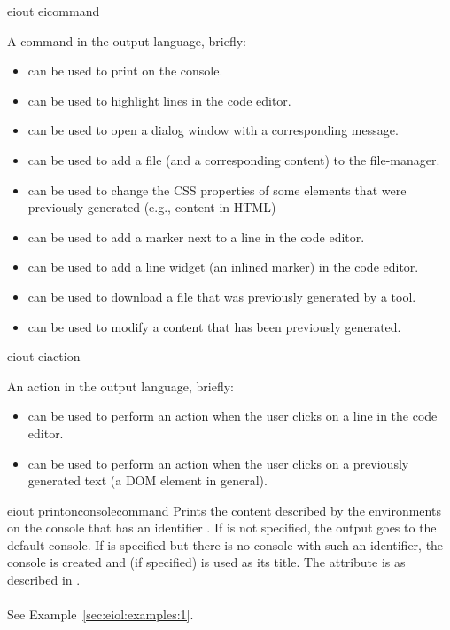 \bigskip
\xmlstruct
{eiout}
{eicommand}
{
A command in the \ei output language, briefly:
\begin{itemize}
\item {} can be used to print on the console.
%
\item {} can be used to highlight
  lines in the code editor.
%
\item {} can be used to open a dialog
  window with a corresponding message.
%
\item {} can be used to add a file (and a
  corresponding content) to the file-manager.
%
\item {} can be used to change the
  CSS properties of some elements that were previously generated
  (e.g., content in HTML)
%
\item {} can be used to add a marker next
  to a line in the code editor.
%
\item {} can be used to add a line
  widget (an inlined marker) in the code editor.
%
%
\item {} can be used to download a
  file that was previously generated by a tool.
%
\item {} can be used to modify
  a content that has been previously generated.
%
\end{itemize}
}


\bigskip
\xmlstruct
{eiout}
{eiaction}
{%
An action in the \ei output language, briefly:
\begin{itemize}
%
\item {} can be used to perform an action
  when the user clicks on a line in the code editor.
%
\item {} can be used to perform an
  action when the user clicks on a previously generated text (a DOM
  element in general).
%
%
\end{itemize}
}


\bigskip
\xmlstruct
{eiout}
{printonconsolecommand}
{%
%
  Prints the content described by the 
  environments on the console that has an identifier
  .
%
  If  is not specified, the output goes to
  the default console.
%
  If  is specified but there is no console
  with such an identifier, the console is created and
   (if specified) is used as its title.
%
  The attribute  is as described in
  .
%
  \\\\See Example~\ref{sec:eiol:examples:1}.
} 

